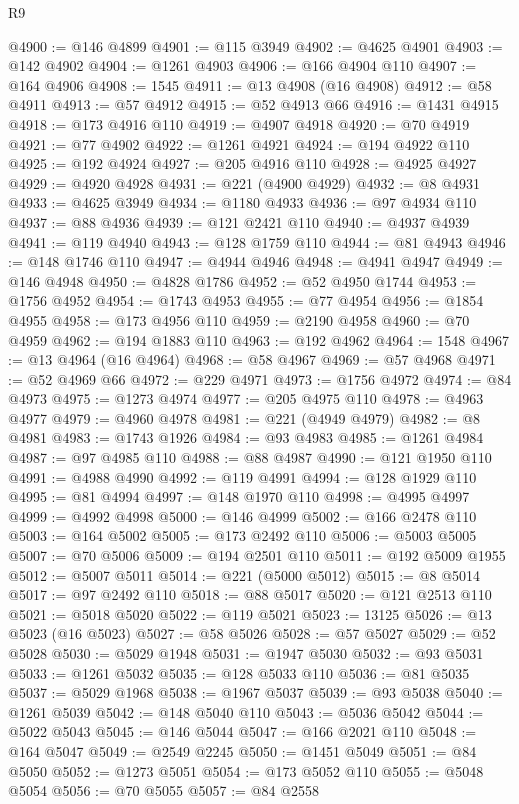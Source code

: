 \begin{lexlean}{R9}
\begin{coremodule}
@4900 := @146 @4899
@4901 := @115 @3949
@4902 := @4625 @4901
@4903 := @142 @4902
@4904 := @1261 @4903
@4906 := @166 @4904 @110
@4907 := @164 @4906
@4908 := 1545
@4911 := @13 @4908 (@16 @4908)
@4912 := @58 @4911
@4913 := @57 @4912
@4915 := @52 @4913 @66
@4916 := @1431 @4915
@4918 := @173 @4916 @110
@4919 := @4907 @4918
@4920 := @70 @4919
@4921 := @77 @4902
@4922 := @1261 @4921
@4924 := @194 @4922 @110
@4925 := @192 @4924
@4927 := @205 @4916 @110
@4928 := @4925 @4927
@4929 := @4920 @4928
@4931 := @221 (@4900 @4929)
@4932 := @8 @4931
@4933 := @4625 @3949
@4934 := @1180 @4933
@4936 := @97 @4934 @110
@4937 := @88 @4936
@4939 := @121 @2421 @110
@4940 := @4937 @4939
@4941 := @119 @4940
@4943 := @128 @1759 @110
@4944 := @81 @4943
@4946 := @148 @1746 @110
@4947 := @4944 @4946
@4948 := @4941 @4947
@4949 := @146 @4948
@4950 := @4828 @1786
@4952 := @52 @4950 @1744
@4953 := @1756 @4952
@4954 := @1743 @4953
@4955 := @77 @4954
@4956 := @1854 @4955
@4958 := @173 @4956 @110
@4959 := @2190 @4958
@4960 := @70 @4959
@4962 := @194 @1883 @110
@4963 := @192 @4962
@4964 := 1548
@4967 := @13 @4964 (@16 @4964)
@4968 := @58 @4967
@4969 := @57 @4968
@4971 := @52 @4969 @66
@4972 := @229 @4971
@4973 := @1756 @4972
@4974 := @84 @4973
@4975 := @1273 @4974
@4977 := @205 @4975 @110
@4978 := @4963 @4977
@4979 := @4960 @4978
@4981 := @221 (@4949 @4979)
@4982 := @8 @4981
@4983 := @1743 @1926
@4984 := @93 @4983
@4985 := @1261 @4984
@4987 := @97 @4985 @110
@4988 := @88 @4987
@4990 := @121 @1950 @110
@4991 := @4988 @4990
@4992 := @119 @4991
@4994 := @128 @1929 @110
@4995 := @81 @4994
@4997 := @148 @1970 @110
@4998 := @4995 @4997
@4999 := @4992 @4998
@5000 := @146 @4999
@5002 := @166 @2478 @110
@5003 := @164 @5002
@5005 := @173 @2492 @110
@5006 := @5003 @5005
@5007 := @70 @5006
@5009 := @194 @2501 @110
@5011 := @192 @5009 @1955
@5012 := @5007 @5011
@5014 := @221 (@5000 @5012)
@5015 := @8 @5014
@5017 := @97 @2492 @110
@5018 := @88 @5017
@5020 := @121 @2513 @110
@5021 := @5018 @5020
@5022 := @119 @5021
@5023 := 13125
@5026 := @13 @5023 (@16 @5023)
@5027 := @58 @5026
@5028 := @57 @5027
@5029 := @52 @5028
@5030 := @5029 @1948
@5031 := @1947 @5030
@5032 := @93 @5031
@5033 := @1261 @5032
@5035 := @128 @5033 @110
@5036 := @81 @5035
@5037 := @5029 @1968
@5038 := @1967 @5037
@5039 := @93 @5038
@5040 := @1261 @5039
@5042 := @148 @5040 @110
@5043 := @5036 @5042
@5044 := @5022 @5043
@5045 := @146 @5044
@5047 := @166 @2021 @110
@5048 := @164 @5047
@5049 := @2549 @2245
@5050 := @1451 @5049
@5051 := @84 @5050
@5052 := @1273 @5051
@5054 := @173 @5052 @110
@5055 := @5048 @5054
@5056 := @70 @5055
@5057 := @84 @2558

\end{coremodule}
\end{lexlean}
